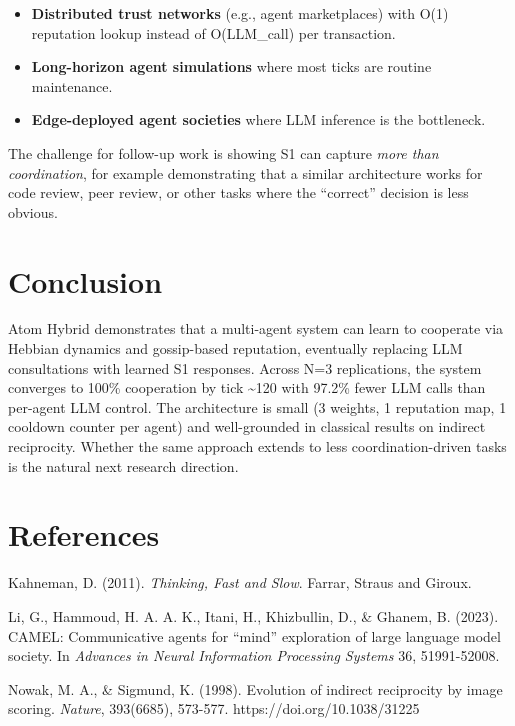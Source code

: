 \documentclass[
  11pt,
  letterpaper,
]{article}
\providecommand{\tightlist}{%
  \setlength{\itemsep}{0pt}\setlength{\parskip}{0pt}}
\begin{document}
\begin{itemize}
\tightlist
\item
  \textbf{Distributed trust networks} (e.g., agent marketplaces) with
  O(1) reputation lookup instead of O(LLM\_call) per transaction.
\item
  \textbf{Long-horizon agent simulations} where most ticks are routine
  maintenance.
\item
  \textbf{Edge-deployed agent societies} where LLM inference is the
  bottleneck.
\end{itemize}

The challenge for follow-up work is showing S1 can capture \emph{more
than coordination}, for example demonstrating that a similar
architecture works for code review, peer review, or other tasks where
the ``correct'' decision is less obvious.

\section{Conclusion}\label{conclusion}

Atom Hybrid demonstrates that a multi-agent system can learn to
cooperate via Hebbian dynamics and gossip-based reputation, eventually
replacing LLM consultations with learned S1 responses. Across N=3
replications, the system converges to 100\% cooperation by tick
\textasciitilde120 with 97.2\% fewer LLM calls than per-agent LLM
control. The architecture is small (3 weights, 1 reputation map, 1
cooldown counter per agent) and well-grounded in classical results on
indirect reciprocity. Whether the same approach extends to less
coordination-driven tasks is the natural next research direction.

\section*{References}\label{references}

Kahneman, D. (2011). \emph{Thinking, Fast and Slow}. Farrar, Straus and
Giroux.

Li, G., Hammoud, H. A. A. K., Itani, H., Khizbullin, D., \& Ghanem, B.
(2023). CAMEL: Communicative agents for ``mind'' exploration of large
language model society. In \emph{Advances in Neural Information
Processing Systems} 36, 51991-52008.

Nowak, M. A., \& Sigmund, K. (1998). Evolution of indirect reciprocity
by image scoring. \emph{Nature}, 393(6685), 573-577.
https://doi.org/10.1038/31225
\end{document}
